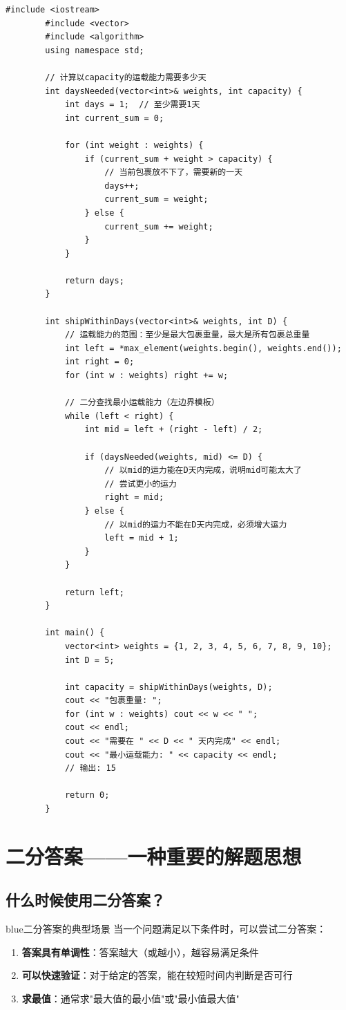 \documentclass[12pt,a4paper]{article}
\begin{document}
	\begin{lstlisting}[caption={例题6：传送带运载能力}]
		#include <iostream>
		#include <vector>
		#include <algorithm>
		using namespace std;
		
		// 计算以capacity的运载能力需要多少天
		int daysNeeded(vector<int>& weights, int capacity) {
			int days = 1;  // 至少需要1天
			int current_sum = 0;
			
			for (int weight : weights) {
				if (current_sum + weight > capacity) {
					// 当前包裹放不下了，需要新的一天
					days++;
					current_sum = weight;
				} else {
					current_sum += weight;
				}
			}
			
			return days;
		}
		
		int shipWithinDays(vector<int>& weights, int D) {
			// 运载能力的范围：至少是最大包裹重量，最大是所有包裹总重量
			int left = *max_element(weights.begin(), weights.end());
			int right = 0;
			for (int w : weights) right += w;
			
			// 二分查找最小运载能力（左边界模板）
			while (left < right) {
				int mid = left + (right - left) / 2;
				
				if (daysNeeded(weights, mid) <= D) {
					// 以mid的运力能在D天内完成，说明mid可能太大了
					// 尝试更小的运力
					right = mid;
				} else {
					// 以mid的运力不能在D天内完成，必须增大运力
					left = mid + 1;
				}
			}
			
			return left;
		}
		
		int main() {
			vector<int> weights = {1, 2, 3, 4, 5, 6, 7, 8, 9, 10};
			int D = 5;
			
			int capacity = shipWithinDays(weights, D);
			cout << "包裹重量: ";
			for (int w : weights) cout << w << " ";
			cout << endl;
			cout << "需要在 " << D << " 天内完成" << endl;
			cout << "最小运载能力: " << capacity << endl;
			// 输出: 15
			
			return 0;
		}
	\end{lstlisting}
	
	\section{二分答案——一种重要的解题思想}
	
	\subsection{什么时候使用二分答案？}
	
	\begin{mybox}{blue}{二分答案的典型场景}
		当一个问题满足以下条件时，可以尝试二分答案：
		\begin{enumerate}
			\item \textbf{答案具有单调性}：答案越大（或越小），越容易满足条件
			\item \textbf{可以快速验证}：对于给定的答案，能在较短时间内判断是否可行
			\item \textbf{求最值}：通常求"最大值的最小值"或"最小值最大值"
		\end{enumerate}
	\end{mybox}
	
\end{document}
